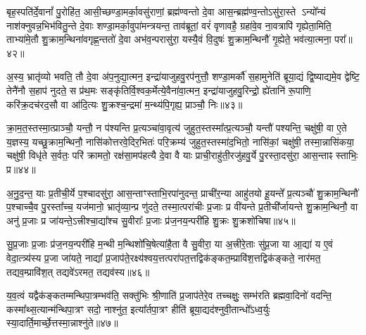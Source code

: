 {\anuvakamend[{म॒नु॒ष्य॒च॒रावु॑दपा॒त्रमु॑प॒ह्वये॑त द्विदेव॒त्याः᳚ षट्च॑त्वारिꣳशच्च॥९॥}]}

बृह॒स्पति॑र्दे॒वानां᳚ पु॒रोहि॑त॒ आसी॒च्छण्डा॒मर्का॒वसु॑राणां॒ ब्रह्म॑ण्वन्तो दे॒वा आस॒न्ब्रह्म॑ण्व॒न्तो\-ऽसु॑रा॒स्ते \-ऽन्यो᳚न्यं नाश॑क्नुवन्न॒भिभ॑वितु॒न्ते दे॒वाः शण्डा॒मर्का॒वुपा॑मन्त्रयन्त॒ ताव॑ब्रूतां॒ वरं॑ वृणावहै॒ ग्रहा॑वे॒व ना॒वत्रापि॑ गृह्येता॒मिति॒ ताभ्या॑मे॒तौ शु॒क्राम॒न्थिना॑वगृह्ण॒न्ततो॑ दे॒वा अभ॑व॒न्परासु॑रा॒ यस्यै॒वं वि॒दुषः॑ शु॒क्राम॒न्थिनौ॑ गृ॒ह्येते॒ भव॑त्या॒त्मना॒ परा᳚॥४२॥

अ॒स्य॒ भ्रातृ॑व्यो भवति॒ तौ दे॒वा अ॑प॒नुद्या॒त्मन॒ इन्द्रा॑याजुहवु॒रप॑नुत्तौ॒ शण्डा॒मर्कौ॑ स॒हामुनेति॑ ब्रूया॒द्यं द्वि॒ष्याद्यमे॒व द्वेष्टि॒ तेनै॑नौ स॒हाप॑ नुदते॒ स प्र॑थ॒मः सङ्कृ॑तिर्वि॒श्वक॒र्मेत्ये॒वैना॑वा॒त्मन॒ इन्द्रा॑याजुहवु॒रिन्द्रो॒ ह्ये॑तानि॑ रू॒पाणि॒ करि॑क्र॒दच॑रद॒सौ वा आ॑दि॒त्यः शु॒क्रश्च॒न्द्रमा॑ म॒न्थ्य॑पि॒गृह्य॒ प्राञ्चौ॒ निः॥४३॥

क्रा॒म॒त॒स्तस्मा॒त्प्राञ्चौ॒ यन्तौ॒ न प॑श्यन्ति प्र॒त्यञ्चा॑वा॒वृत्य॑ जुहुत॒स्तस्मा᳚त्प्र॒त्यञ्चौ॒ यन्तौ॑ पश्यन्ति॒ चक्षु॑षी॒ वा ए॒ते य॒ज्ञस्य॒ यच्छु॒क्राम॒न्थिनौ॒ नासि॑कोत्तरवे॒दिर॒भितः॑ परि॒क्रम्य॑ जुहुत॒स्तस्मा॑द॒भितो॒ नासि॑कां॒ चक्षु॑षी॒ तस्मा॒न्नासि॑कया॒ चक्षु॑षी॒ विधृ॑ते स॒र्वतः॒ परि॑ क्रामतो॒ रक्ष॑सा॒मप॑हत्यै दे॒वा वै याः प्राची॒राहु॑ती॒रजु॑हवु॒र्ये पु॒रस्ता॒दसु॑रा॒ आस॒न्ताꣴ स्ताभिः॒ प्र॥४४॥

अ॒नु॒द॒न्त॒ याः प्र॒तीची॒र्ये प॒श्चादसु॑रा॒ आस॒न्ताꣳस्ताभि॒रपा॑नुदन्त॒ प्राची॑र॒न्या आहु॑तयो हू॒यन्ते᳚ प्र॒त्यञ्चौ॑ शु॒क्राम॒न्थिनौ॑ प॒श्चाच्चै॒व पु॒रस्ता᳚च्च॒ यज॑मानो॒ भ्रातृ॑व्या॒न्प्र णु॑दते॒ तस्मा॒त्परा॑चीः प्र॒जाः प्र वी॑यन्ते प्र॒तीची᳚र्जायन्ते शु॒क्राम॒न्थिनौ॒ वा अनु॑ प्र॒जाः प्र जा॑यन्ते॒\-ऽत्त्रीश्चा॒द्या᳚श्च सु॒वीराः᳚ प्र॒जाः प्र॑ज॒नय॒न्परी॑हि शु॒क्रः शु॒क्रशो॑चिषा॥४५॥

सु॒प्र॒जाः प्र॒जाः प्र॑ज॒नय॒न्परी॑हि म॒न्थी म॒न्थिशो॑चि॒षेत्या॑है॒ता वै सु॒वीरा॒ या अ॒त्त्रीरे॒ताः सु॑प्र॒जा या आ॒द्या॑ य ए॒वं वेदा॒त्त्र्य॑स्य प्र॒जा जा॑यते॒ नाद्या᳚ प्र॒जाप॑ते॒रक्ष्य॑श्वय॒त्तत्परा॑पत॒त्तद्विक॑ङ्कत॒म्प्रावि॑श॒त्तद्विक॑ङ्कते॒ नार॑मत॒ तद्यव॒म्प्रावि॑श॒त् तद्यवे॑\-ऽरमत॒ तद्यव॑स्य॥४६॥

य॒व॒त्वं यद्वैक॑ङ्कतम्मन्थिपा॒त्रम्भव॑ति॒ सक्तु॑भिः श्री॒णाति॑ प्र॒जाप॑तेरे॒व तच्चक्षुः॒ सम्भ॑रति ब्रह्मवा॒दिनो॑ वदन्ति॒ कस्मा᳚थ्स॒त्यान्म॑न्थिपा॒त्रꣳ सदो॒ नाश्नु॑त॒ इत्या᳚र्तपा॒त्रꣳ हीति॑ ब्रूया॒द्यद॑श्नुवी॒तान्धो᳚\-ऽध्व॒र्युः स्या॒दार्ति॒मार्च्छे॒त्तस्मा॒न्नाश्नु॑ते॥४७॥

{\anuvakamend[{आ॒त्मना॒ परा॒ निष्प्र शु॒क्रशो॑चिषा॒ यव॑स्य स॒प्तत्रिꣳ॑शच्च॥10॥}]}

